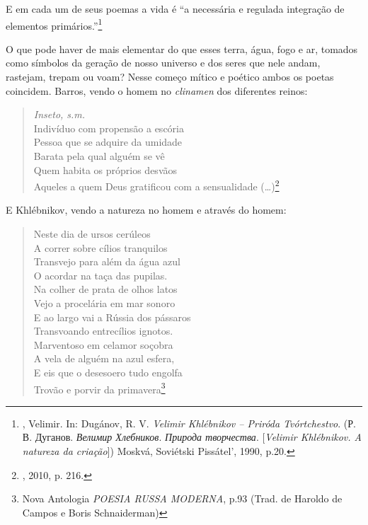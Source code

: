 E em cada um de seus poemas a vida é ``a necessária e regulada
integração de elementos primários.''\footnote{, Velimir. In:
  Dugánov, R. V. \emph{Velimir Khlébnikov -- Priróda Tvórtchestvo}. (Р.
  В. Дуганов. \emph{Велимир Хлебников}. \emph{Природа творчества}.
  [\emph{Velimir Khlébnikov. A natureza da criação}]) Moskvá,
  Soviétski Pissátel', 1990, p.20.}

O que pode haver de mais elementar do que esses terra, água, fogo e ar,
tomados como símbolos da geração de nosso universo e dos seres que nele
andam, rastejam, trepam ou voam? Nesse começo mítico e poético ambos os
poetas coincidem. Barros, vendo o homem no \emph{clinamen} dos
diferentes reinos:

\begin{verse}
\emph{Inseto, s.m.} \\
Indivíduo com propensão a escória \\
Pessoa que se adquire da umidade \\
Barata pela qual alguém se vê \\
Quem habita os próprios desvãos \\
Aqueles a quem Deus gratificou com a \qb{}sensualidade (\ldots{})\footnote{,
  2010, p. 216.}
\end{verse}

E Khlébnikov, vendo a natureza no homem e através do homem:

\begin{verse}
Neste dia de ursos cerúleos \\
A correr sobre cílios tranquilos \\
Transvejo para além da água azul \\
O acordar na taça das pupilas. \\[8pt]
Na colher de prata de olhos latos \\
Vejo a procelária em mar sonoro \\
E ao largo vai a Rússia dos pássaros \\
Transvoando entrecílios ignotos. \\[8pt]
Marventoso em celamor soçobra \\
A vela de alguém na azul esfera, \\
E eis que o desesoero tudo engolfa \\
Trovão e porvir da primavera\footnote{Nova Antologia \emph{POESIA RUSSA
  MODERNA}, p.93 (Trad. de Haroldo de Campos e Boris Schnaiderman)}
\end{verse}

